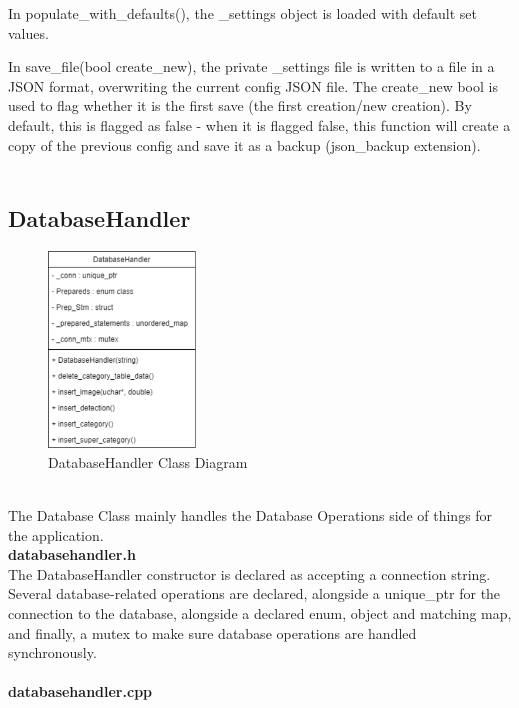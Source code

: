 \documentclass[conference]{IEEEtran}
\begin{document}
In populate\_with\_defaults(), the \_settings object is loaded with default set values.

In save\_file(bool create\_new), the private \_settings file is written to a file in a JSON format, overwriting the current config JSON file. The create\_new bool is used to flag whether it is the first save (the first creation/new creation). By default, this is flagged as false - when it is flagged false, this function will create a copy of the previous config and save it as a backup (json\_backup extension).~\\~\\


\subsection{DatabaseHandler}

\begin{figure}[h]
    \centering
    \includegraphics[width=0.35\textwidth]{images/code_diagrams/databasehandler_uml.eps}
    \caption{DatabaseHandler Class Diagram}
\end{figure}~\\

The Database Class mainly handles the Database Operations side of things for the application.\\


\textbf{databasehandler.h}~\\

The DatabaseHandler constructor is declared as accepting a connection string. Several database-related operations are declared, alongside a unique\_ptr for the connection to the database, alongside a declared enum, object and matching map, and finally, a mutex to make sure database operations are handled synchronously.~\\~\\


\textbf{databasehandler.cpp}~\\
\end{document}
